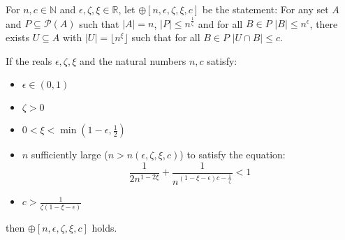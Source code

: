     \label{n_large_enough_property}
    For $n, c \in \mathbb{N}$ and $\epsilon, \zeta, \xi \in \mathbb{R}$, let $\oplus[n, \epsilon, \zeta, \xi, c]$ be
        the statement:
    For any set $A$ and $P \subseteq \mathcal{P}(A)$ such that $|A| = n$, $|P| \leq n^{\frac{1}{\zeta}}$ and for all
        $B \in P$ $|B| \leq n^\epsilon$, there exists $U \subseteq A$ with $|U| = \lfloor n^\xi \rfloor$ such that
        for all $B \in P$ $|U \cap B| \leq c$.

    \lemma[Lemma 4.19]\label{n_large_enough_valid_values}
        If the reals $\epsilon, \zeta, \xi$ and the natural numbers $n, c$ satisfy:
        \begin{itemize}
            \item $\epsilon \in (0,1)$
            \item $\zeta > 0$
            \item $0 < \xi < \min(1-\epsilon, \frac{1}{2})$
            \item $n$ sufficiently large ($n > n(\epsilon, \zeta, \xi, c)$) to satisfy the equation:\[
                \frac{1}{2n^{1-2\xi}} + \frac{1}{n^{(1 - \xi - \epsilon)c - \frac{1}{\zeta}}} < 1
            \]
            \item $c > \frac{1}{\zeta (1 - \xi - \epsilon)}$
        \end{itemize}
            then $\oplus[n, \epsilon, \zeta, \xi, c]$ holds.
